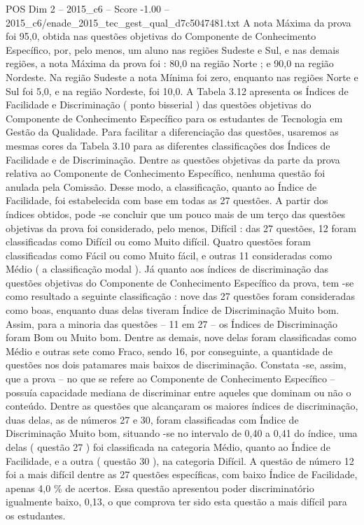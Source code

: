 \begin{textsample}{POS Dim 2 – 2015\_c6 – Score -1.00 – 2015\_c6/enade\_2015\_tec\_gest\_qual\_d7c5047481.txt}
A nota Máxima da prova foi 95,0, obtida nas questões objetivas do Componente de Conhecimento Específico, por, pelo menos, um aluno nas regiões Sudeste e Sul, e nas demais regiões, a nota Máxima da prova foi : 80,0 na região Norte ; e 90,0 na região Nordeste.
Na região Sudeste a nota Mínima foi zero, enquanto nas regiões Norte e Sul foi 5,0, e na região Nordeste, foi 10,0.
A Tabela 3.12 apresenta os Índices de Facilidade e Discriminação ( ponto bisserial ) das questões objetivas do Componente de Conhecimento Específico para os estudantes de Tecnologia em Gestão da Qualidade.
Para facilitar a diferenciação das questões, usaremos as mesmas cores da Tabela 3.10 para as diferentes classificações dos Índices de Facilidade e de Discriminação.
Dentre as questões objetivas da parte da prova relativa ao Componente de Conhecimento Específico, nenhuma questão foi anulada pela Comissão.
Desse modo, a classificação, quanto ao Índice de Facilidade, foi estabelecida com base em todas as 27 questões.
A partir dos índices obtidos, pode -se concluir que um pouco mais de um terço das questões objetivas da prova foi considerado, pelo menos, Difícil : das 27 questões, 12 foram classificadas como Difícil ou como Muito difícil.
Quatro questões foram classificadas como Fácil ou como Muito fácil, e outras 11 consideradas como Médio ( a classificação modal ).
Já quanto aos índices de discriminação das questões objetivas do Componente de Conhecimento Específico da prova, tem -se como resultado a seguinte classificação : nove das 27 questões foram consideradas como boas, enquanto duas delas tiveram Índice de Discriminação Muito bom.
Assim, para a minoria das questões – 11 em 27 – os Índices de Discriminação foram Bom ou Muito bom.
Dentre as demais, nove delas foram classificadas como Médio e outras sete como Fraco, sendo 16, por conseguinte, a quantidade de questões nos dois patamares mais baixos de discriminação.
Constata -se, assim, que a prova – no que se refere ao Componente de Conhecimento Específico – possuía capacidade mediana de discriminar entre aqueles que dominam ou não o conteúdo.
Dentre as questões que alcançaram os maiores índices de discriminação, duas delas, as de números 27 e 30, foram classificadas com Índice de Discriminação Muito bom, situando -se no intervalo de 0,40 a 0,41 do índice, uma delas ( questão 27 ) foi classificada na categoria Médio, quanto ao Índice de Facilidade, e a outra ( questão 30 ), na categoria Difícil.
A questão de número 12 foi a mais difícil dentre as 27 questões específicas, com baixo Índice de Facilidade, apenas 4,0 \% de acertos.
Essa questão apresentou poder discriminatório igualmente baixo, 0,13, o que comprova ter sido esta questão a mais difícil para os estudantes.

\end{textsample}
